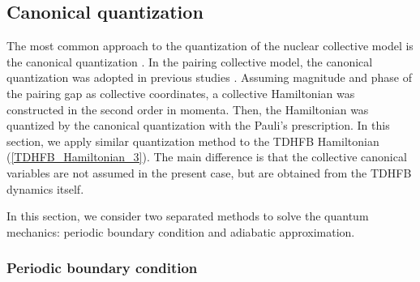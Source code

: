 \documentclass[%
superscriptaddress,
preprint,
showpacs,
nofootinbib,
amsmath,amssymb,
prc,
floatfix ]%
{revtex4-1}
\begin{document}
\subsection{Canonical quantization}
\label{sec:canonical}

The most common approach to the quantization of the nuclear collective model
is the canonical quantization \cite{BM75}.
In the pairing collective model, the canonical quantization
was adopted in previous studies \cite{BBPK70,delta1,delta3}.
Assuming magnitude and phase of the pairing gap as collective coordinates,
a collective Hamiltonian was constructed in the second order in momenta.
Then, the Hamiltonian was quantized by the canonical quantization
with the Pauli's prescription.
In this section, we apply similar quantization method to
the TDHFB Hamiltonian (\ref{TDHFB_Hamiltonian_3}).
The main difference is that the collective canonical variables are
not assumed in the present case, but are obtained from the TDHFB dynamics
itself.\par
In this section, we consider two separated methods to solve the quantum mechanics: periodic boundary condition and adiabatic approximation. 

\subsubsection{Periodic boundary condition}
\end{document}
